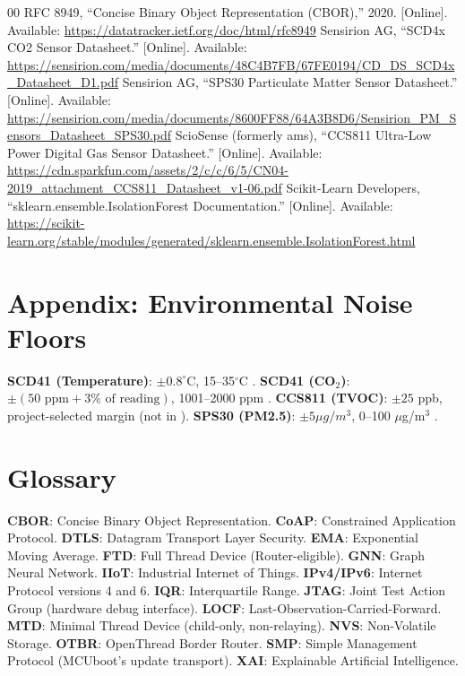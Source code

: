 \documentclass[conference]{IEEEtran}
\begin{document}
\begin{thebibliography}{00}
 RFC 8949, ``Concise Binary Object Representation (CBOR),'' 2020. [Online]. Available: \url{https://datatracker.ietf.org/doc/html/rfc8949}
 Sensirion AG, ``SCD4x CO2 Sensor Datasheet.'' [Online]. Available: \url{https://sensirion.com/media/documents/48C4B7FB/67FE0194/CD_DS_SCD4x_Datasheet_D1.pdf}
 Sensirion AG, ``SPS30 Particulate Matter Sensor Datasheet.'' [Online]. Available: \url{https://sensirion.com/media/documents/8600FF88/64A3B8D6/Sensirion_PM_Sensors_Datasheet_SPS30.pdf}
 ScioSense (formerly ams), ``CCS811 Ultra-Low Power Digital Gas Sensor Datasheet.'' [Online]. Available: \url{https://cdn.sparkfun.com/assets/2/c/c/6/5/CN04-2019_attachment_CCS811_Datasheet_v1-06.pdf}
 Scikit-Learn Developers, ``sklearn.ensemble.IsolationForest Documentation.'' [Online]. Available: \url{https://scikit-learn.org/stable/modules/generated/sklearn.ensemble.IsolationForest.html}
\end{thebibliography}

\section*{Appendix: Environmental Noise Floors}
\textbf{SCD41 (Temperature)}: $\pm0.8^{\circ}$C, 15--35$^\circ$C \cite{b11}.
\textbf{SCD41 (CO$_2$)}: $\pm(50\text{ ppm} + 3\%\text{ of reading})$, 1001--2000 ppm \cite{b11}.
\textbf{CCS811 (TVOC)}: $\pm25$ ppb, project-selected margin (not in \cite{b12}).
\textbf{SPS30 (PM2.5)}: $\pm5 \mu g/m^3$, 0--100 $\mu$g/m$^3$ \cite{b13}.
\vspace{-6pt}
\section*{Glossary}
\textbf{CBOR}: Concise Binary Object Representation.
\textbf{CoAP}: Constrained Application Protocol.
\textbf{DTLS}: Datagram Transport Layer Security.
\textbf{EMA}: Exponential Moving Average.
\textbf{FTD}: Full Thread Device (Router-eligible).
\textbf{GNN}: Graph Neural Network.
\textbf{IIoT}: Industrial Internet of Things.
\textbf{IPv4/IPv6}: Internet Protocol versions 4 and 6.
\textbf{IQR}: Interquartile Range.
\textbf{JTAG}: Joint Test Action Group (hardware debug interface).
\textbf{LOCF}: Last-Observation-Carried-Forward.
\textbf{MTD}: Minimal Thread Device (child-only, non-relaying).
\textbf{NVS}: Non-Volatile Storage.
\textbf{OTBR}: OpenThread Border Router.
\textbf{SMP}: Simple Management Protocol (MCUboot's update transport).
\textbf{XAI}: Explainable Artificial Intelligence.
\end{document}
